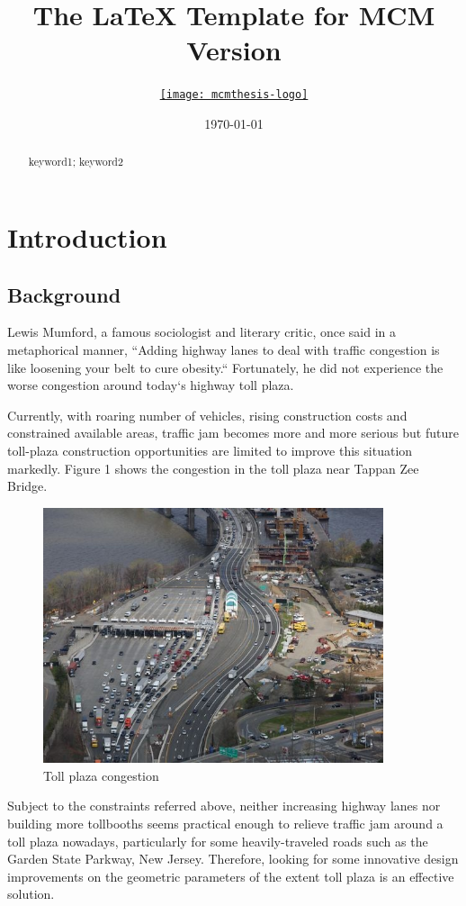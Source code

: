 \documentclass{mcmthesis}
\title{The \LaTeX{} Template for MCM Version \MCMversion}
\author{\small \href{http://www.latexstudio.net/}
  {\texttt{[image: mcmthesis-logo]}}}
\date{\today}
\begin{document}
\begin{abstract}
\lipsum[1]%
\begin{keywords}
keyword1; keyword2
\end{keywords}
\end{abstract}
\maketitle
\tableofcontents
\newpage

\section{Introduction}
\subsection{Background}

Lewis Mumford, a famous sociologist and literary critic,
once said in a metaphorical manner, ``Adding highway lanes
to deal with traffic congestion is like loosening your
belt to cure obesity.`` Fortunately, he did not experience
the worse congestion around today`s highway toll plaza.

Currently, with roaring number of vehicles, rising
construction costs and constrained available areas,
traffic jam becomes more and more serious but future
toll-plaza construction opportunities are limited to
improve this situation markedly. Figure 1 shows the
congestion in the toll plaza near Tappan Zee Bridge.

\begin{figure}[h]
\small
\centering
\includegraphics[width=10cm]{figure1}
\caption{Toll plaza congestion}\label{fig1}
\end{figure}

Subject to the constraints referred above, neither
increasing highway lanes nor building more tollbooths
seems practical enough to relieve traffic jam around a
toll plaza nowadays, particularly for some heavily-traveled
 roads such as the Garden State Parkway, New Jersey.
 Therefore, looking for some innovative design improvements
  on the geometric parameters of the extent toll plaza
  is an effective solution.
\end{document}
